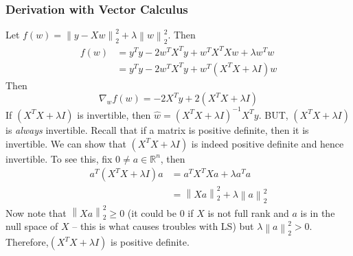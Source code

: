 \documentclass[12pt]{article}
\theoremstyle{definition}
\newcommand{\R}{\mathbb{R}}
\newcommand{\norm}[1]{\left\lVert#1\right\rVert}
\begin{document}
\subsubsection{Derivation with Vector Calculus}
Let $f(w) = \norm{y - Xw}^2_2 + \lambda \norm{w}^2_2$. Then
\begin{align*}
	f(w) &= y^Ty - 2w^T X^T y + w^T X^T X w + \lambda w^T w \\
	&= y^T y - 2 w^T X^T y + w^T (X^T X + \lambda I) w
\end{align*}
Then
\begin{equation}
	\nabla_w f(w) = -2X^Ty + 2(X^TX + \lambda I)
\end{equation}
If $(X^TX + \lambda I)$ is invertible, then $\hat w = (X^TX + \lambda I)^{-1}X^T y$. BUT, $(X^TX + \lambda I)$ is \textit{always} invertible. Recall that if a matrix is positive definite, then it is invertible. We can show that  $(X^TX + \lambda I)$ is indeed positive definite and hence invertible. To see this, fix $0 \neq a \in \R^n$, then 
\begin{align*}
	a^T (X^TX + \lambda I) a &= a^T X^T X a + \lambda a^T a \\
	&= \norm{Xa}^2_2 + \lambda \norm{a}^2_2 
\end{align*}
Now note that $\norm{Xa}^2_2 \geq 0$ (it could be $0$ if $X$ is not full rank and $a$ is in the null space of $X$ -- this is what causes troubles with LS) but $\lambda \norm{a}^2_2 > 0$. Therefore,$(X^TX + \lambda I)$ is positive definite. 
\end{document}
